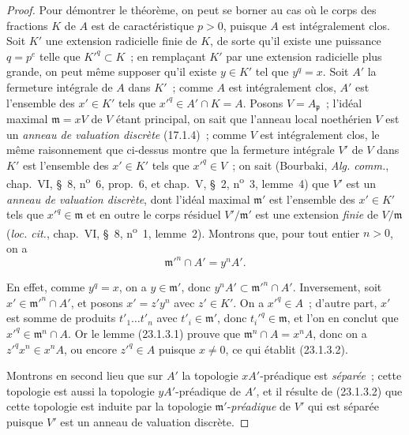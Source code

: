 \begin{proof}
Pour démontrer le théorème, on peut se borner au cas où le corps des fractions
$K$ de $A$ est de caractéristique $p>0$, puisque $A$ est intégralement clos.
Soit $K'$ une extension radicielle finie de $K$, de sorte qu'il existe une
puissance $q=p^e$ telle que $K'^q\subset K$~; en remplaçant $K'$ par une
extension radicielle plus grande, on peut même supposer qu'il existe $y\in K'$
tel que $y^q=x$. Soit $A'$ la fermeture intégrale de $A$ dans $K'$~; comme
$A$ est intégralement clos, $A'$ est l'ensemble des $x'\in K'$ tels que
$x'^q\in A'\cap K=A$. Posons $V=A_{\mathfrak p}$~; l'idéal maximal
$\mathfrak m=xV$ de $V$ étant principal, on sait que l'anneau local
noethérien $V$ est un \emph{anneau de valuation discrète} (17.1.4)~; comme
$V$ est intégralement clos, le même
raisonnement que ci-dessus montre que la fermeture intégrale $V'$ de $V$ dans
$K'$ est l'ensemble des $x'\in K'$ tels que $x'^q\in V$~; on sait
(Bourbaki, \emph{Alg. comm.}, chap.~VI, §~8, n\textsuperscript{o}~6,
prop.~6, et chap.~V, §~2, n\textsuperscript{o}~3, lemme~4) que $V'$ est un
\emph{anneau de valuation discrète}, dont l'idéal maximal $\mathfrak m'$ est
l'ensemble des $x'\in K'$ tels que $x'^q\in\mathfrak m$ et en outre le corps
résiduel $V'/\mathfrak m'$ est une extension \emph{finie} de
$V/\mathfrak m$ (\emph{loc. cit.}, chap.~VI, §~8,
n\textsuperscript{o}~1, lemme~2). Montrons que, pour tout entier $n>0$, on a
\begin{equation}
\label{0.23.1.3.2-fr}
  \mathfrak m'^n\cap A'=y^nA'.
  \tag{23.1.3.2}
\end{equation}

En effet, comme $y^q=x$, on a $y\in\mathfrak m'$, donc
$y^nA'\subset\mathfrak m'^n\cap A'$. Inversement, soit
$x'\in\mathfrak m'^n\cap A'$, et posons $x'=z'y^n$ avec $z'\in K'$. On a
$x'^q\in A$~; d'autre part, $x'$ est somme de produits
$t'_1\ldots t'_n$ avec $t'_i\in\mathfrak m'$, donc
$t_i'^q\in\mathfrak m$, et l'on en conclut que
$x'^q\in\mathfrak m^n\cap A$. Or le lemme (23.1.3.1) prouve que
$\mathfrak m^n\cap A=x^nA$, donc on a $z'^qx^n\in x^nA$, ou encore
$z'^q\in A$ puisque $x\neq0$, ce qui établit (23.1.3.2).

Montrons en second lieu que sur $A'$ la topologie $xA'$-préadique est
\emph{séparée}~; cette topologie est aussi la topologie $yA'$-préadique de
$A'$, et il résulte de (23.1.3.2) que cette topologie est induite par la
topologie $\mathfrak m'$-\emph{préadique} de $V'$ qui est séparée puisque $V'$ est
un anneau de valuation discrète.


\end{proof}
